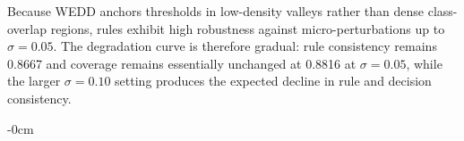 \documentclass[make,article,submit,pdftex,moreauthors]{Definitions/mdpi}
\begin{document}
Because WEDD anchors thresholds in low-density valleys rather than dense class-overlap regions, rules exhibit high robustness against micro-perturbations up to $\sigma = 0.05$. The degradation curve is therefore gradual: rule consistency remains 0.8667 and coverage remains essentially unchanged at 0.8816 at $\sigma = 0.05$, while the larger $\sigma = 0.10$ setting produces the expected decline in rule and decision consistency.

\begin{adjustwidth}{-\extralength}{0cm}




\PublishersNote{}

\end{adjustwidth}
\end{document}
